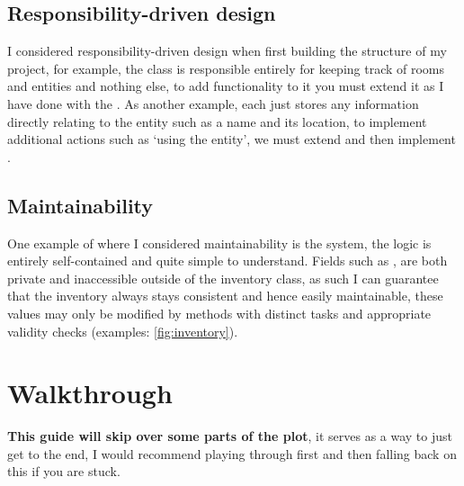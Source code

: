 \documentclass{article}
\begin{document}
\begin{multicols}{2}
            \subsection{Responsibility-driven design}
                I considered responsibility-driven design when first building the structure of my project, for example, the  class is responsible entirely for keeping track of rooms and entities and nothing else, to add functionality to it you must extend it as I have done with the . As another example, each  just stores any information directly relating to the entity such as a name and its location, to implement additional actions such as `using the entity', we must extend  and then implement .

            \subsection{Maintainability}
                One example of where I considered maintainability is the  system, the logic is entirely self-contained and quite simple to understand. Fields such as ,  are both private and inaccessible outside of the inventory class, as such I can guarantee that the inventory always stays consistent and hence easily maintainable, these values may only be modified by methods with distinct tasks and appropriate validity checks (examples: \autoref{fig:inventory}).

        \section{Walkthrough}
            \textbf{\color{cRed}This guide will skip over some parts of the plot}, it serves as a way to just get to the end, I would recommend playing through first and then falling back on this if you are stuck. \\


\end{multicols}
\end{document}
